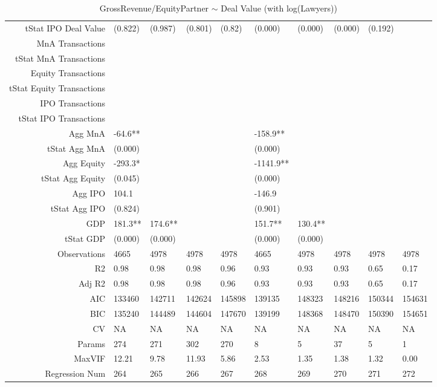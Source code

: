 \begin{table}[ht]
\begin{tabular}{rlllllllll}
  tStat IPO Deal Value & (0.822) & (0.987) & (0.801) & (0.82) & (0.000) & (0.000) & (0.000) & (0.192) &  \\ 
  MnA Transactions &  &  &  &  &  &  &  &  &  \\ 
  tStat MnA Transactions &  &  &  &  &  &  &  &  &  \\ 
  Equity Transactions &  &  &  &  &  &  &  &  &  \\ 
  tStat Equity Transactions &  &  &  &  &  &  &  &  &  \\ 
  IPO Transactions &  &  &  &  &  &  &  &  &  \\ 
  tStat IPO Transactions &  &  &  &  &  &  &  &  &  \\ 
  Agg MnA & -64.6** &  &  &  & -158.9** &  &  &  &  \\ 
  tStat Agg MnA & (0.000) &  &  &  & (0.000) &  &  &  &  \\ 
  Agg Equity & -293.3* &  &  &  & -1141.9** &  &  &  &  \\ 
  tStat Agg Equity & (0.045) &  &  &  & (0.000) &  &  &  &  \\ 
  Agg IPO & 104.1 &  &  &  & -146.9 &  &  &  &  \\ 
  tStat Agg IPO & (0.824) &  &  &  & (0.901) &  &  &  &  \\ 
  GDP & 181.3** & 174.6** &  &  & 151.7** & 130.4** &  &  &  \\ 
  tStat GDP & (0.000) & (0.000) &  &  & (0.000) & (0.000) &  &  &  \\ 
  Observations & 4665 & 4978 & 4978 & 4978 & 4665 & 4978 & 4978 & 4978 & 4978 \\ 
  R2 & 0.98 & 0.98 & 0.98 & 0.96 & 0.93 & 0.93 & 0.93 & 0.65 & 0.17 \\ 
  Adj R2 & 0.98 & 0.98 & 0.98 & 0.96 & 0.93 & 0.93 & 0.93 & 0.65 & 0.17 \\ 
  AIC & 133460 & 142711 & 142624 & 145898 & 139135 & 148323 & 148216 & 150344 & 154631 \\ 
  BIC & 135240 & 144489 & 144604 & 147670 & 139199 & 148368 & 148470 & 150390 & 154651 \\ 
  CV & NA & NA & NA & NA & NA & NA & NA & NA & NA \\ 
  Params & 274 & 271 & 302 & 270 & 8 & 5 & 37 & 5 & 1 \\ 
  MaxVIF & 12.21 & 9.78 & 11.93 & 5.86 & 2.53 & 1.35 & 1.38 & 1.32 & 0.00 \\ 
  Regression Num & 264 & 265 & 266 & 267 & 268 & 269 & 270 & 271 & 272 \\ 
   \hline
\end{tabular}
\caption{GrossRevenue/EquityPartner $\sim$ Deal Value (with log(Lawyers))} 
\end{table}
